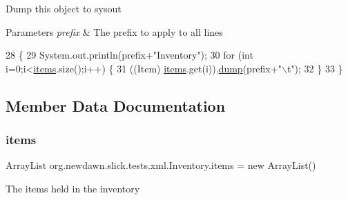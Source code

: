 Dump this object to sysout


\begin{DoxyParams}{Parameters}
{\em prefix} & The prefix to apply to all lines \\
\hline
\end{DoxyParams}

\begin{DoxyCode}
28                                     \{
29         System.out.println(prefix+\textcolor{stringliteral}{"Inventory"});
30         \textcolor{keywordflow}{for} (\textcolor{keywordtype}{int} i=0;i<\mbox{\hyperlink{namespaceitems}{items}}.size();i++) \{
31             ((Item) \mbox{\hyperlink{namespaceitems}{items}}.get(i)).\mbox{\hyperlink{classorg_1_1newdawn_1_1slick_1_1tests_1_1xml_1_1_inventory_ae6476f32141f6791d3b69cc9687fae4a}{dump}}(prefix+\textcolor{stringliteral}{"\(\backslash\)t"});
32         \}
33     \}
\end{DoxyCode}


\subsection{Member Data Documentation}
\mbox{\label{classorg_1_1newdawn_1_1slick_1_1tests_1_1xml_1_1_inventory_a2bfc94164f1557cee534126a6c27e690}} 
\subsubsection{\texorpdfstring{items}{items}}
{\footnotesize\ttfamily Array\+List org.\+newdawn.\+slick.\+tests.\+xml.\+Inventory.\+items = new Array\+List()\hspace{0.3cm}{\ttfamily [private]}}

The items held in the inventory 